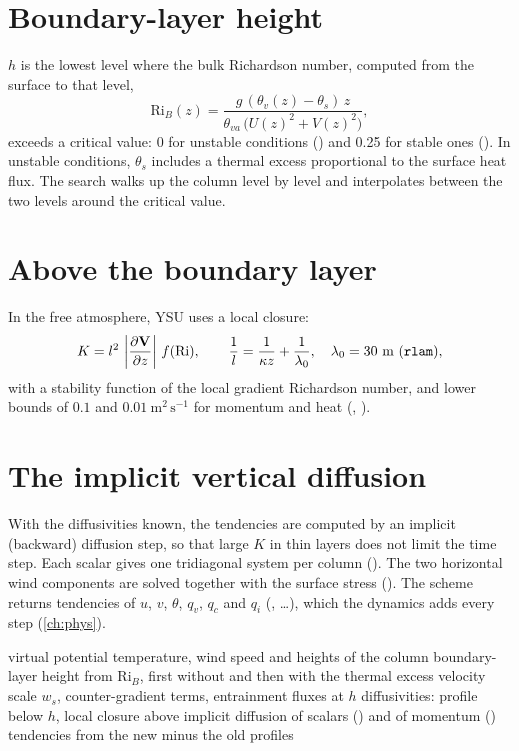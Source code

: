\section{Boundary-layer height}

$h$ is the lowest level where the bulk Richardson number, computed from the surface to that level,
\begin{equation}
  \mathrm{Ri}_B(z) = \frac{g\,(\theta_v(z) - \theta_s)\,z}{\theta_{va}\,\bigl(U(z)^2 + V(z)^2\bigr)},
\end{equation}
exceeds a critical value: 0 for unstable conditions () and 0.25 for stable ones (). In
unstable conditions, $\theta_s$ includes a thermal excess proportional to the surface heat flux. The search walks up
the column level by level and interpolates between the two levels around the critical value.

\section{Above the boundary layer}

In the free atmosphere, YSU uses a local closure:
\begin{equation}
  K = l^2\,\left|\pd{\mathbf{V}}{z}\right|\,f(\mathrm{Ri}), \qquad \frac{1}{l} = \frac{1}{\kappa z} + \frac{1}{\lambda_0},
  \quad \lambda_0 = 30\ \text{m} \ (\code{rlam}),
\end{equation}
with a stability function of the local gradient Richardson number, and lower bounds of $0.1$ and
$0.01\ \text{m}^2\,\text{s}^{-1}$ for momentum and heat (, ).

\section{The implicit vertical diffusion}

With the diffusivities known, the tendencies are computed by an implicit (backward) diffusion step, so that large $K$
in thin layers does not limit the time step. Each scalar gives one tridiagonal system per column
(). The two horizontal wind components are solved together with the
surface stress (). The scheme returns tendencies of $u$, $v$, $\theta$, $q_v$, $q_c$ and $q_i$
(, \dots), which the dynamics adds every step (\cref{ch:phys}).

\begin{algorithm}[ht]
\caption{One YSU column (simplified).}
\label{alg:ysu}
\begin{algorithmic}[1]
\State virtual potential temperature, wind speed and heights of the column
\State boundary-layer height from $\mathrm{Ri}_B$, first without and then with the thermal excess
\State velocity scale $w_s$, counter-gradient terms, entrainment fluxes at $h$
\State diffusivities: profile below $h$, local closure above
\State implicit diffusion of scalars () and of momentum ()
\State tendencies from the new minus the old profiles
\end{algorithmic}
\end{algorithm}

